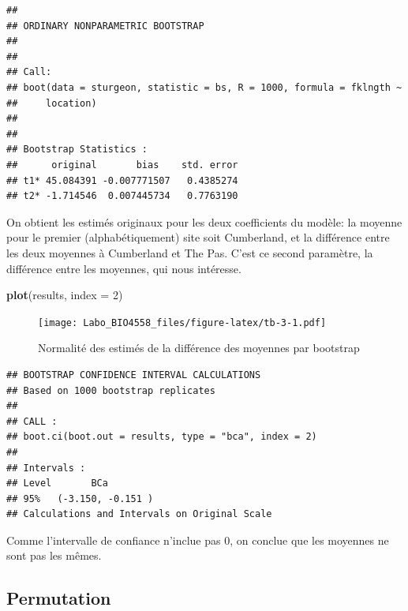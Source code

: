 \documentclass[12pt,]{book}
\newenvironment{Shaded}{\begin{snugshade}}{\end{snugshade}}
\newcommand{\CommentTok}[1]{\textcolor[rgb]{0.37,0.37,0.37}{\textit{#1}}}
\newcommand{\DataTypeTok}[1]{\textcolor[rgb]{0.27,0.27,0.27}{#1}}
\newcommand{\DecValTok}[1]{\textcolor[rgb]{0.06,0.06,0.06}{#1}}
\newcommand{\KeywordTok}[1]{\textcolor[rgb]{0.27,0.27,0.27}{\textbf{#1}}}
\newcommand{\NormalTok}[1]{#1}
\newcommand{\StringTok}[1]{\textcolor[rgb]{0.5,0.5,0.5}{#1}}
\begin{document}
\begin{verbatim}
## 
## ORDINARY NONPARAMETRIC BOOTSTRAP
## 
## 
## Call:
## boot(data = sturgeon, statistic = bs, R = 1000, formula = fklngth ~ 
##     location)
## 
## 
## Bootstrap Statistics :
##      original       bias    std. error
## t1* 45.084391 -0.007771507   0.4385274
## t2* -1.714546  0.007445734   0.7763190
\end{verbatim}

On obtient les estimés originaux pour les deux coefficients du modèle: la moyenne pour le premier (alphabétiquement) site soit Cumberland, et la différence entre les deux moyennes à Cumberland et The Pas. C'est ce second paramètre, la différence entre les moyennes, qui nous intéresse.

\begin{Shaded}
\begin{Highlighting}[]
\KeywordTok{plot}\NormalTok{(results, }\DataTypeTok{index =} \DecValTok{2}\NormalTok{)}
\end{Highlighting}
\end{Shaded}

\begin{figure}
\centering
\texttt{[image: Labo\_BIO4558\_files/figure-latex/tb-3-1.pdf]}
\caption{\label{fig:tb-3}Normalité des estimés de la différence des moyennes par bootstrap}
\end{figure}

\begin{Shaded}
\end{Shaded}

\begin{verbatim}
## BOOTSTRAP CONFIDENCE INTERVAL CALCULATIONS
## Based on 1000 bootstrap replicates
## 
## CALL : 
## boot.ci(boot.out = results, type = "bca", index = 2)
## 
## Intervals : 
## Level       BCa          
## 95%   (-3.150, -0.151 )  
## Calculations and Intervals on Original Scale
\end{verbatim}

Comme l'intervalle de confiance n'inclue pas 0, on conclue que les moyennes ne sont pas les mêmes.

\hypertarget{permutation}{%
\subsection{Permutation}\label{permutation}}
\end{document}
